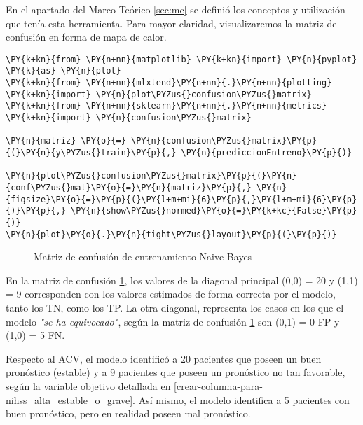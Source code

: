 	En el apartado del Marco Teórico \ref{sec:mc} se definió los conceptos y utilización que tenía esta herramienta. Para mayor claridad, visualizaremos la matriz de confusión en forma de mapa de calor.

    \begin{tcolorbox}[breakable, size=fbox, boxrule=1pt, pad at break*=1mm,colback=cellbackground, colframe=cellborder]
\begin{Verbatim}[commandchars=\\\{\}]
\PY{k+kn}{from} \PY{n+nn}{matplotlib} \PY{k+kn}{import} \PY{n}{pyplot} \PY{k}{as} \PY{n}{plot}
\PY{k+kn}{from} \PY{n+nn}{mlxtend}\PY{n+nn}{.}\PY{n+nn}{plotting} \PY{k+kn}{import} \PY{n}{plot\PYZus{}confusion\PYZus{}matrix}
\PY{k+kn}{from} \PY{n+nn}{sklearn}\PY{n+nn}{.}\PY{n+nn}{metrics} \PY{k+kn}{import} \PY{n}{confusion\PYZus{}matrix}

\PY{n}{matriz} \PY{o}{=} \PY{n}{confusion\PYZus{}matrix}\PY{p}{(}\PY{n}{y\PYZus{}train}\PY{p}{,} \PY{n}{prediccionEntreno}\PY{p}{)}

\PY{n}{plot\PYZus{}confusion\PYZus{}matrix}\PY{p}{(}\PY{n}{conf\PYZus{}mat}\PY{o}{=}\PY{n}{matriz}\PY{p}{,} \PY{n}{figsize}\PY{o}{=}\PY{p}{(}\PY{l+m+mi}{6}\PY{p}{,}\PY{l+m+mi}{6}\PY{p}{)}\PY{p}{,} \PY{n}{show\PYZus{}normed}\PY{o}{=}\PY{k+kc}{False}\PY{p}{)}
\PY{n}{plot}\PY{o}{.}\PY{n}{tight\PYZus{}layout}\PY{p}{(}\PY{p}{)}
\end{Verbatim}
\end{tcolorbox}

\begin{center}
    	\begin{figure}[H]
	\centering
	\caption{Matriz de confusión de entrenamiento Naive Bayes}
	\label{fig:mcenb}
	\end{figure}
\end{center}

	En la matriz de confusión \ref{fig:mcenb}, los valores de la diagonal principal (0,0) = 20 y (1,1) = 9 corresponden con los valores estimados de forma correcta por el modelo, tanto los TN, como los TP. La otra diagonal, representa los casos en los que el modelo \textit{"se ha equivocado"}, según la matriz de confusión \ref{fig:mcenb} son (0,1) = 0 FP y (1,0) = 5 FN.
\par Respecto al ACV, el modelo identificó a 20 pacientes que poseen un buen pronóstico (estable) y a 9 pacientes que poseen un pronóstico no tan favorable, según la variable objetivo detallada en \ref{crear-columna-para-nihss_alta_estable_o_grave}. Así mismo, el modelo identifica a 5 pacientes con buen pronóstico, pero en realidad poseen mal pronóstico.\\
